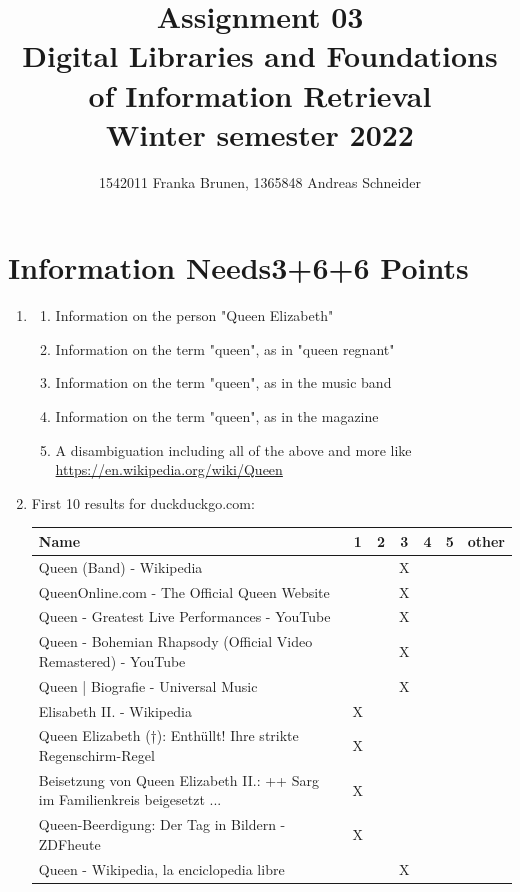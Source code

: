 \documentclass[10pt,a4paper]{article}
\title{ \vspace{-3em}
        Assignment 03\\
		\small{\bf Digital Libraries and Foundations of Information Retrieval}\\
		\small{Winter semester 2022}}
\author{\small{1542011 Franka Brunen}, \small{1365848 Andreas Schneider}}
\date{}
\begin{document}
\setlength{\parskip}{6pt} %
\setlength{\parindent}{0pt}

\leftskip=1cm\rightskip=0.5cm %

\maketitle

\section{\hfill Information Needs\hfill 3+6+6 Points}
\begin{enumerate}
    \item \begin{enumerate}
            \item Information on the person "Queen Elizabeth"
            \item Information on the term "queen", as in "queen regnant"
            \item Information on the term "queen", as in the music band
            \item Information on the term "queen", as in the magazine
            \item A disambiguation including all of the above and more like \url{https://en.wikipedia.org/wiki/Queen}
        \end{enumerate}
    \item First 10 results for duckduckgo.com:\\
        \hspace*{-2cm}\begin{tabular}{|p{}||c|c|c|c|c|c|}
            \hline
            \textbf{Name} & \textbf{1} & \textbf{2} & \textbf{3} & \textbf{4} & \textbf{5} & \textbf{other}\\
            \hline
            Queen (Band) - Wikipedia&&&X&&&\\
            QueenOnline.com - The Official Queen Website&&&X&&&\\
            Queen - Greatest Live Performances - YouTube&&&X&&&\\
            Queen - Bohemian Rhapsody (Official Video Remastered) - YouTube&&&X&&&\\
            Queen | Biografie - Universal Music&&&X&&&\\
            Elisabeth II. - Wikipedia&X&&&&&\\
            Queen Elizabeth (†): Enthüllt! Ihre strikte Regenschirm-Regel&X&&&&&\\
            Beisetzung von Queen Elizabeth II.: ++ Sarg im Familienkreis beigesetzt ...&X&&&&&\\
            Queen-Beerdigung: Der Tag in Bildern - ZDFheute&X&&&&&\\
            Queen - Wikipedia, la enciclopedia libre&&&X&&&\\
            \hline
        \end{tabular}
        

\end{enumerate}
\end{document}
